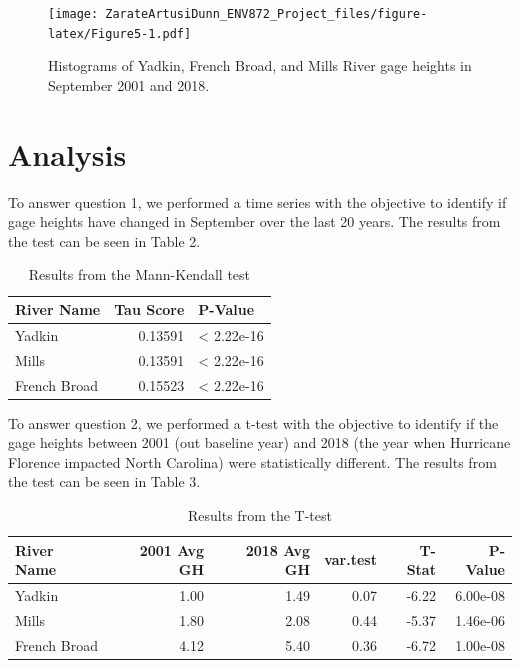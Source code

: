 \documentclass[
  12pt,
]{article}
\begin{document}
\begin{figure}
\centering
\texttt{[image: ZarateArtusiDunn\_ENV872\_Project\_files/figure-latex/Figure5-1.pdf]}
\caption{Histograms of Yadkin, French Broad, and Mills River gage
heights in September 2001 and 2018.}
\end{figure}

\newpage

\hypertarget{analysis}{%
\section{Analysis}\label{analysis}}

To answer question 1, we performed a time series with the objective to
identify if gage heights have changed in September over the last 20
years. The results from the test can be seen in Table 2.

\begin{table}

\caption{\label{tab:ResultsTable1}Results from the Mann-Kendall test}
\centering
\begin{tabular}[t]{l|r|l}
\hline
River Name & Tau Score & P-Value\\
\hline
Yadkin & 0.13591 & < 2.22e-16\\
\hline
Mills & 0.13591 & < 2.22e-16\\
\hline
French Broad & 0.15523 & < 2.22e-16\\
\hline
\end{tabular}
\end{table}

To answer question 2, we performed a t-test with the objective to
identify if the gage heights between 2001 (out baseline year) and 2018
(the year when Hurricane Florence impacted North Carolina) were
statistically different. The results from the test can be seen in Table
3.

\begin{table}

\caption{\label{tab:ResultsTable2}Results from the T-test}
\centering
\begin{tabular}[t]{|>{}l|||>{}r|||>{}r|||>{}r|||>{}r|||>{}r|}
\hline
River Name & 2001 Avg GH & 2018 Avg GH & var.test & T-Stat & P-Value\\
\hline
Yadkin & 1.00 & 1.49 & 0.07 & -6.22 & 6.00e-08\\
\hline
Mills & 1.80 & 2.08 & 0.44 & -5.37 & 1.46e-06\\
\hline
French Broad & 4.12 & 5.40 & 0.36 & -6.72 & 1.00e-08\\
\hline
\end{tabular}
\end{table}
\end{document}
